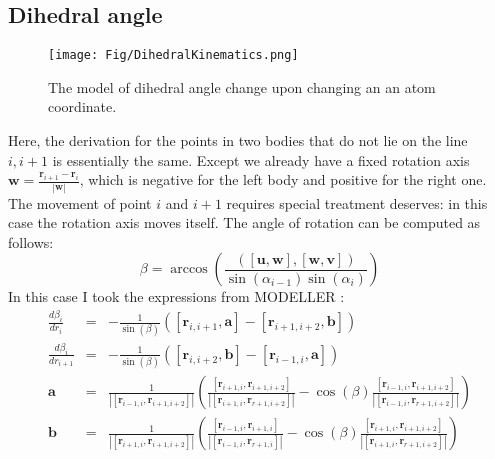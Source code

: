 \subsection{Dihedral angle}

\begin{figure}[H]
    \centering
    \texttt{[image: Fig/DihedralKinematics.png]}
    \caption{The model of dihedral angle change upon changing an an atom coordinate.}
    \label{Fig:DihedralKinematics}
\end{figure}

Here, the derivation for the points in two bodies that do not lie on the line $i, i+1$ is essentially the same. Except
we already have a fixed rotation axis $\mathbf{w} = \frac{\mathbf{r}_{i+1} - \mathbf{r}_i}{|\mathbf{w}|}$, which is 
negative for the left body and positive for the right one.
The movement of point $i$ and $i+1$ requires special treatment deserves: in this case the rotation axis moves itself.
The angle of rotation can be computed as follows:
$$
\beta = \arccos \left( \frac{ \left([\mathbf{u}, \mathbf{w}], [\mathbf{w}, \mathbf{v}] \right) }{\sin(\alpha_{i-1}) \sin(\alpha_{i})} \right)
$$
In this case I took the expressions from MODELLER \cite{}:
$$
\begin{array}{lcl}
\frac{d\beta_i}{dr_{i}} &=& -\frac{1}{\sin(\beta)} \left( [\mathbf{r}_{i,i+1}, \mathbf{a}] - [\mathbf{r}_{i+1,i+2}, \mathbf{b}] \right) \\
\frac{d\beta_i}{dr_{i+1}} &=& -\frac{1}{\sin(\beta)} \left( [\mathbf{r}_{i,i+2}, \mathbf{b}] - [\mathbf{r}_{i-1,i}, \mathbf{a}] \right) \\
\mathbf{a} &=& \frac{1}{\left| [\mathbf{r}_{i-1,i}, \mathbf{r}_{i+1,i+2}] \right|} 
    \left( 
        \frac{[\mathbf{r}_{i+1,i}, \mathbf{r}_{i+1,i+2}]}{\left| [\mathbf{r}_{i+1,i}, \mathbf{r}_{r+1,i+2}] \right|} - 
        \cos(\beta)
        \frac{[\mathbf{r}_{i-1,i}, \mathbf{r}_{i+1,i+2}]}{\left| [\mathbf{r}_{i-1,i}, \mathbf{r}_{r+1,i+2}] \right|}
    \right)\\

\mathbf{b} &=& \frac{1}{\left| [\mathbf{r}_{i+1,i}, \mathbf{r}_{i+1,i+2}] \right|} 
    \left( 
        \frac{[\mathbf{r}_{i-1,i}, \mathbf{r}_{i+1,i}]}{\left| [\mathbf{r}_{i-1,i}, \mathbf{r}_{r+1,i}] \right|} - 
        \cos(\beta)
        \frac{[\mathbf{r}_{i+1,i}, \mathbf{r}_{i+1,i+2}]}{\left| [\mathbf{r}_{i+1,i}, \mathbf{r}_{r+1,i+2}] \right|}
    \right)
\end{array}
$$

